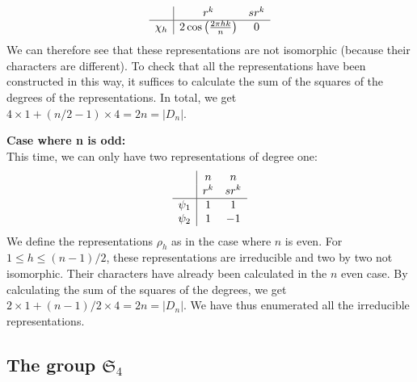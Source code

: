\begin{equation*}
\begin{array}{c | cc} & r^k & sr^k \\\hline \chi_h & 2 \cos \left(\frac{2 \pi hk}{n} \right) & 0 \end{array}
\end{equation*}
We can therefore see that these representations are not isomorphic (because their characters are different). To check that all the representations have been constructed in this way, it suffices to calculate the sum of the squares of the degrees of the representations. In total, we get $ 4 \times 1 + (n / 2 - 1) \times 4 = 2 n = | D_n | $.
 
 
\textbf{Case where n is odd:} \\This time, we can only have two representations of degree one:
\begin{equation*}
\begin{array}{c | cc} & n & n \\& r^k & sr^k \\\hline \psi_1 & 1 & 1 \\\psi_2 & 1 & -1 \\\end{array}
\end{equation*}
We define the representations $ \rho_h $ as in the case where $ n $ is even. For $ 1 \leq h \leq (n-1) / 2 $, these representations are irreducible and two by two not isomorphic. Their characters have already been calculated in the $ n $ even case. By calculating the sum of the squares of the degrees, we get $ 2 \times 1 + (n-1) / 2 \times 4 = 2 n = | D_n | $. We have thus enumerated all the irreducible representations.
\subsection{The group $ \mathfrak{S}_4 $}
\label{sect2-group-s4}
 
